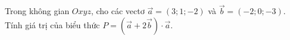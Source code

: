 \begin{ex}
Trong không gian $Oxyz$, cho các vectơ $\vec{a}=(3;1;-2)$ và $\vec{b}=(-2;0;-3)$. Tính giá trị của biểu thức $P=(\vec{a}+2\vec{b})\cdot\vec{a}$.
\end{ex}
